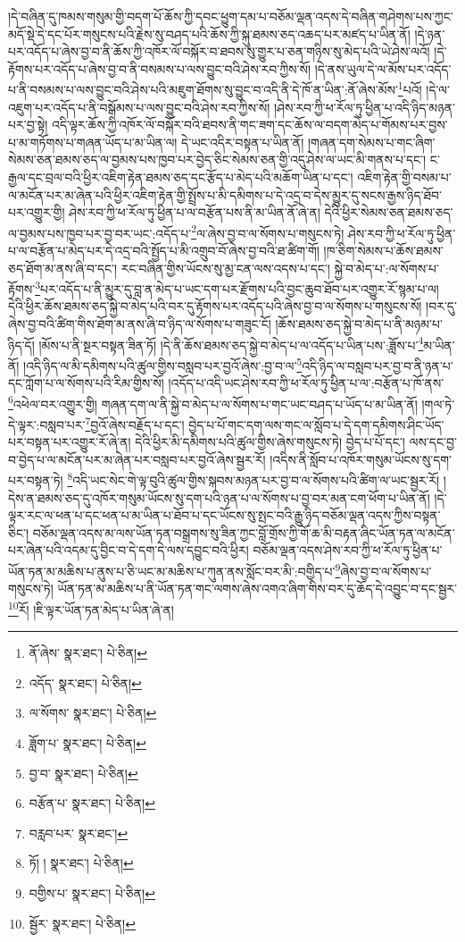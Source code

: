 །དེ་བཞིན་དུ་ཁམས་གསུམ་གྱི་བདག་པོ་ཆོས་ཀྱི་དབང་ཕྱུག་དམ་པ་བཅོམ་ལྡན་འདས་དེ་བཞིན་གཤེགས་པས་ཀྱང་མདོ་སྡེ་དེ་དང་པོར་གསུངས་པའི་རྗེས་སུ་བཤད་པའི་ཆོས་ཀྱི་སྐུ་ཐམས་ཅད་འཆད་པར་མཛད་པ་ཡིན་ནོ། །དེ་ཉན་པར་འདོད་པ་ཞེས་བྱ་བ་ནི་ཆོས་ཀྱི་འཁོར་ལོ་བསྐོར་བ་ཐབས་སུ་གྱུར་པ་ཅན་གཉིས་སུ་མེད་པའི་ཡེ་ཤེས་ལའོ། །དེ་རྟོགས་པར་འདོད་པ་ཞེས་བྱ་བ་ནི་བསམས་པ་ལས་བྱུང་བའི་ཤེས་རབ་ཀྱིས་སོ། །དེ་ནས་ཡུལ་དེ་ལ་མོས་པར་འདོད་པ་ནི་བསམས་པ་ལས་བྱུང་བའི་ཤེས་པའི་མཇུག་ཐོགས་སུ་བྱུང་བ་འདི་ནི་དེ་ཁོ་ན་ཡིན་:ནོ་ཞེས་མོས་\footnote{ནོ་ཞེས་  སྣར་ཐང་།  པེ་ཅིན། }པའོ། །དེ་ལ་འཇུག་པར་འདོད་པ་ནི་བསྒོམས་པ་ལས་བྱུང་བའི་ཤེས་རབ་ཀྱིས་སོ། །ཤེས་རབ་ཀྱི་ཕ་རོལ་ཏུ་ཕྱིན་པ་འདི་ཉིད་མཉན་པར་བྱ་སྟེ། འདི་ལྟར་ཆོས་ཀྱི་འཁོར་ལོ་བསྐོར་བའི་ཐབས་ནི་གང་ཟག་དང་ཆོས་ལ་བདག་མེད་པ་གོམས་པར་བྱས་པ་མ་གཏོགས་པ་གཞན་ཡོད་པ་མ་ཡིན་ལ། དེ་ཡང་འདིར་བསྟན་པ་ཡིན་ནོ། །གཞན་དག་སེམས་པ་གང་ཞིག་སེམས་ཅན་ཐམས་ཅད་ལ་བྱམས་པས་ཁྱབ་པར་བྱེད་ཅིང་སེམས་ཅན་གྱི་འདུ་ཤེས་ལ་ཡང་མི་གནས་པ་དང་། ང་རྒྱལ་དང་བྲལ་བའི་ཕྱིར་འཇིག་རྟེན་ཐམས་ཅད་དང་རྩོད་པ་མེད་པའི་མཆོག་ཡིན་པ་དང་། འཇིག་རྟེན་གྱི་བསམ་པ་ལ་མངོན་པར་མ་ཞེན་པའི་ཕྱིར་འཇིག་རྟེན་གྱི་སྤྲོས་པ་མི་དམིགས་པ་དེ་འདྲ་བ་དེས་མྱུར་དུ་སངས་རྒྱས་ཉིད་ཐོབ་པར་འགྱུར་གྱི། ཤེས་རབ་ཀྱི་ཕ་རོལ་ཏུ་ཕྱིན་པ་ལ་བརྩོན་པས་ནི་མ་ཡིན་ནོ་ཞེ་ན། དེའི་ཕྱིར་སེམས་ཅན་ཐམས་ཅད་ལ་བྱམས་པས་ཁྱབ་པར་བྱ་བར་ཡང་:འདོད་པ་\footnote{འདོད་  སྣར་ཐང་།  པེ་ཅིན། }ལ་ཞེས་བྱ་བ་ལ་སོགས་པ་གསུངས་ཏེ། ཤེས་རབ་ཀྱི་ཕ་རོལ་ཏུ་ཕྱིན་པ་ལ་བརྩོན་པ་མེད་པར་དེ་འདྲ་བའི་སྤྱོད་པ་མི་འགྲུབ་བོ་ཞེས་བྱ་བའི་ཐ་ཚིག་གོ། །ཁ་ཅིག་སེམས་པ་ཆོས་ཐམས་ཅད་ཐོག་མ་ནས་ཞི་བ་དང་། རང་བཞིན་གྱིས་ཡོངས་སུ་མྱ་ངན་ལས་འདས་པ་དང་། སྐྱེ་བ་མེད་པ་:ལ་སོགས་པ་རྟོགས་\footnote{ལ་སོགས་  སྣར་ཐང་།  པེ་ཅིན། }པར་འདོད་པ་ནི་མྱུར་དུ་བླ་ན་མེད་པ་ཡང་དག་པར་རྫོགས་པའི་བྱང་ཆུབ་ཐོབ་པར་འགྱུར་རོ་སྙམ་པ་ལ། དེའི་ཕྱིར་ཆོས་ཐམས་ཅད་སྐྱེ་བ་མེད་པའི་བར་དུ་རྟོགས་པར་འདོད་པའི་ཞེས་བྱ་བ་ལ་སོགས་པ་གསུངས་སོ། །བར་དུ་ཞེས་བྱ་བའི་ཚིག་གིས་ཐོག་མ་ནས་ཞི་བ་ཉིད་ལ་སོགས་པ་གཟུང་ངོ། །ཆོས་ཐམས་ཅད་སྐྱེ་བ་མེད་པ་ནི་མཉམ་པ་ཉིད་དོ། །མོས་པ་ནི་སྔར་བསྟན་ཟིན་ཏོ། །དེ་ནི་ཆོས་ཐམས་ཅད་སྐྱེ་བ་མེད་པ་ལ་འདོད་པ་ཡིན་པས་:ཟློས་པ་\footnote{ཟློག་པ་  སྣར་ཐང་།  པེ་ཅིན། }མ་ཡིན་ནོ། །འདི་ཉིད་ལ་མི་དམིགས་པའི་ཚུལ་གྱིས་བསླབ་པར་བྱའོ་ཞེས་:བྱ་བ་ལ་\footnote{བྱ་བ་  སྣར་ཐང་།  པེ་ཅིན། }འདི་ཉིད་ལ་བསླབ་པར་བྱ་བ་ནི་ཉན་པ་དང་ཀློག་པ་ལ་སོགས་པའི་རིམ་གྱིས་སོ། །འདོད་པ་འདི་ཡང་ཤེས་རབ་ཀྱི་ཕ་རོལ་ཏུ་ཕྱིན་པ་ལ་:བརྩོན་པ་ཁོ་ནས་\footnote{བརྩོན་པ་  སྣར་ཐང་།  པེ་ཅིན། }འཕེལ་བར་འགྱུར་གྱི། གཞན་དག་ལ་ནི་སྐྱེ་བ་མེད་པ་ལ་སོགས་པ་གང་ཡང་བཤད་པ་ཡོད་པ་མ་ཡིན་ནོ། །གལ་ཏེ་དེ་ལྟར་:བསླབ་པར་\footnote{བརླབ་པར་  སྣར་ཐང་། }བྱའོ་ཞེས་བརྗོད་པ་དང་། བྱེད་པ་པོ་གང་དག་ལས་གང་ལ་སློབ་པ་དེ་དག་དམིགས་ཤིང་ཡོད་པར་བསྟན་པར་འགྱུར་རོ་ཞེ་ན། དེའི་ཕྱིར་མི་དམིགས་པའི་ཚུལ་གྱིས་ཞེས་གསུངས་ཏེ། བྱེད་པ་པོ་དང་། ལས་དང་བྱ་བ་བྱེད་པ་ལ་མངོན་པར་མ་ཞེན་པར་བསླབ་པར་བྱའོ་ཞེས་སྦྱར་རོ། །འདིས་ནི་སློབ་པ་འཁོར་གསུམ་ཡོངས་སུ་དག་པར་བསྟན་ཏེ། \footnote{ཏོ། །   སྣར་ཐང་།  པེ་ཅིན། }འདི་ཡང་སེང་གེ་ལྟ་བུའི་ཚུལ་གྱིས་སྐབས་མཉན་པར་བྱ་བ་ལ་སོགས་པའི་ཚིག་ལ་ཡང་སྦྱར་རོ། །དེས་ན་ཐམས་ཅད་དུ་འཁོར་གསུམ་ཡོངས་སུ་དག་པའི་ཉན་པ་ལ་སོགས་པ་བྱ་བར་མན་ངག་ཕོག་པ་ཡིན་ནོ། །དེ་ལྟར་རང་ལ་ཕན་པ་དང་ཕན་པ་མ་ཡིན་པ་ཐོབ་པ་དང་ཡོངས་སུ་སྤང་བའི་རྒྱུ་ཉིད་བཅོམ་ལྡན་འདས་ཀྱིས་བསྟན་ཅིང་། བཅོམ་ལྡན་འདས་མ་ལས་ཡོན་ཏན་བསྒྲགས་སུ་ཟིན་ཀྱང་བློ་གྲོས་ཀྱི་གོ་ཆ་མི་བརྟན་ཞིང་ཡོན་ཏན་ལ་མངོན་པར་ཞེན་པའི་འདམ་དུ་བྱིང་བ་དེ་དག་དེ་ལས་དབྱུང་བའི་ཕྱིར། བཅོམ་ལྡན་འདས་ཤེས་རབ་ཀྱི་ཕ་རོལ་ཏུ་ཕྱིན་པ་ཡོན་ཏན་མ་མཆིས་པ་ནུས་པ་ཅི་ཡང་མ་མཆིས་པ་ཀུན་ནས་སློང་བར་མི་:བགྱིད་པ་\footnote{བགྱིས་པ་  སྣར་ཐང་།  པེ་ཅིན། }ཞེས་བྱ་བ་ལ་སོགས་པ་གསུངས་ཏེ། ཡོན་ཏན་མ་མཆིས་པ་ནི་ཡོན་ཏན་གང་ལགས་ཞེས་འགའ་ཞིག་གིས་བར་དུ་ཆོད་དེ་འབྱུང་བ་དང་སྦྱར་\footnote{སྦྱོར་  སྣར་ཐང་།  པེ་ཅིན། }རོ། །ཇི་ལྟར་ཡོན་ཏན་མེད་པ་ཡིན་ཞེ་ན། 